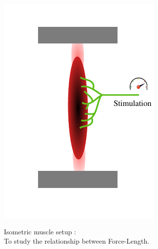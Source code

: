 \documentclass{cmc}
\begin{document}
\begin{figure}[H]
  \centering
  \begin{subfigure}[b]{0.49\textwidth}
    { \centering
      \includegraphics[width=\textwidth]{figures/isometric_muscle}
      \label{fig:isometric_muscle}
    }
    \caption{Isometric muscle setup :\\ To study the relationship
      between Force-Length.}
  \end{subfigure}
  \begin{subfigure}[b]{0.49\textwidth}
    { \centering
}
\end{subfigure}
\end{figure}
\end{document}
